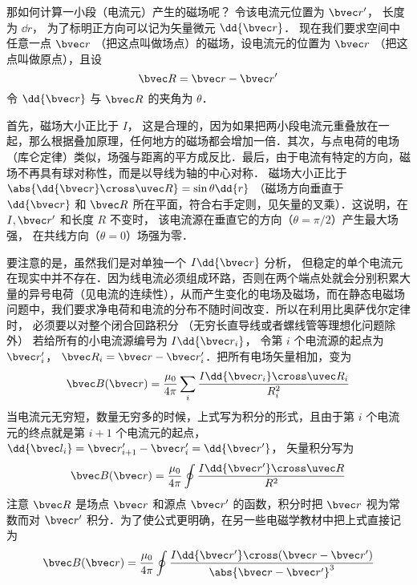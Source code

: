 那如何计算一小段（电流元）产生的磁场呢？ 令该电流元位置为 $\bvec r'$， 长度为 $\dd{r}$， 为了标明正方向可以记为矢量微元 $\dd{\bvec r}$． 现在我们要求空间中任意一点 $\bvec r$ （把这点叫做场点）的磁场，设电流元的位置为 $\bvec r$ （把这点叫做原点），且设
\begin{equation}
\bvec R = \bvec r - \bvec r'
\end{equation}
令 $\dd{\bvec r}$ 与 $\bvec R$ 的夹角为 $\theta$．

首先，磁场大小正比于 $I$， 这是合理的，因为如果把两小段电流元重叠放在一起，那么根据叠加原理，任何地方的磁场都会增加一倍．其次，与点电荷的电场（库仑定律）类似，场强与距离的平方成反比．最后，由于电流有特定的方向，磁场不再具有球对称性，而是以导线为轴的中心对称． 磁场大小正比于 $\abs{\dd{\bvec r} \cross \uvec R} = \sin\theta \dd{r}$ （磁场方向垂直于 $\dd{\bvec r}$ 和 $\bvec R$ 所在平面，符合右手定则，见矢量的叉乘）．这说明，在 $I, \bvec r'$ 和长度 $R$ 不变时， 该电流源在垂直它的方向（$\theta  = \pi /2$）产生最大场强， 在共线方向（$\theta  = 0$）场强为零．

要注意的是，虽然我们是对单独一个 $I\dd{\bvec r}$ 分析， 但稳定的单个电流元在现实中并不存在．因为线电流必须组成环路，否则在两个端点处就会分别积累大量的异号电荷（见电流的连续性），从而产生变化的电场及磁场，而在静态电磁场问题中，我们要求净电荷和电流的分布不随时间改变．所以在利用比奥萨伐尔定律时， 必须要以对整个闭合回路积分 （无穷长直导线或者螺线管等理想化问题除外）%
若给所有的小电流源编号为 $I\dd{\bvec r_i}$， 令第 $i$ 个电流源的起点为 $\bvec r'_i$， $\bvec R_i = \bvec r - \bvec r'_i$．把所有电场矢量相加，变为
\begin{equation}
\bvec B (\bvec r) = \frac{\mu_0}{4\pi} \sum\limits_i \frac{I \dd{\bvec r_i} \cross \uvec R_i}{R_i^2}
\end{equation}
当电流元无穷短，数量无穷多的时候，上式写为积分的形式，且由于第 $i$ 个电流元的终点就是第 $i+1$ 个电流元的起点， $\dd{\bvec l_i} = \bvec r'_{i + 1} - \bvec r'_i = \dd{\bvec r'}$， 矢量积分写为
\begin{equation}\label{BioSav_eq4}
\bvec B (\bvec r) = \frac{\mu_0}{4\pi} \oint \frac{I\dd{\bvec r'} \cross \uvec R}{R^2}
\end{equation}
注意 $\bvec R$ 是场点 $\bvec r$ 和源点 $\bvec r'$ 的函数，积分时把 $\bvec r$ 视为常数而对 $\bvec r'$ 积分．为了使公式更明确，在另一些电磁学教材中把上式直接记为
\begin{equation}\label{BioSav_eq1}
\bvec B(\bvec r) = \frac{\mu_0}{4\pi} \oint \frac{I \dd{\bvec r'} \cross (\bvec r - \bvec r')}{\abs{\bvec r - \bvec r'}^3}
\end{equation}


